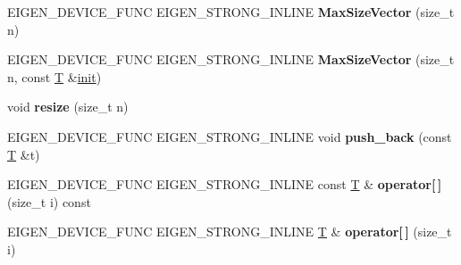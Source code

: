\begin{DoxyCompactItemize}
\item 
\mbox{\label{class_eigen_1_1_max_size_vector_a6a13cfcfe299b9ab443c0c483de82dbb}} 
E\+I\+G\+E\+N\+\_\+\+D\+E\+V\+I\+C\+E\+\_\+\+F\+U\+NC E\+I\+G\+E\+N\+\_\+\+S\+T\+R\+O\+N\+G\+\_\+\+I\+N\+L\+I\+NE {\bfseries Max\+Size\+Vector} (size\+\_\+t n)
\item 
\mbox{\label{class_eigen_1_1_max_size_vector_a917e97a3c9326232702b0f8fc7c4c2d3}} 
E\+I\+G\+E\+N\+\_\+\+D\+E\+V\+I\+C\+E\+\_\+\+F\+U\+NC E\+I\+G\+E\+N\+\_\+\+S\+T\+R\+O\+N\+G\+\_\+\+I\+N\+L\+I\+NE {\bfseries Max\+Size\+Vector} (size\+\_\+t n, const \hyperlink{group___sparse_core___module}{T} \&\hyperlink{structinit}{init})
\item 
\mbox{\label{class_eigen_1_1_max_size_vector_aa438323b34ae0f12ae27db22d70891d8}} 
void {\bfseries resize} (size\+\_\+t n)
\item 
\mbox{\label{class_eigen_1_1_max_size_vector_a8e7af55e22c320493f08e371813c8cea}} 
E\+I\+G\+E\+N\+\_\+\+D\+E\+V\+I\+C\+E\+\_\+\+F\+U\+NC E\+I\+G\+E\+N\+\_\+\+S\+T\+R\+O\+N\+G\+\_\+\+I\+N\+L\+I\+NE void {\bfseries push\+\_\+back} (const \hyperlink{group___sparse_core___module}{T} \&t)
\item 
\mbox{\label{class_eigen_1_1_max_size_vector_a9d3808ef49363f9eebd424b7f66dbbea}} 
E\+I\+G\+E\+N\+\_\+\+D\+E\+V\+I\+C\+E\+\_\+\+F\+U\+NC E\+I\+G\+E\+N\+\_\+\+S\+T\+R\+O\+N\+G\+\_\+\+I\+N\+L\+I\+NE const \hyperlink{group___sparse_core___module}{T} \& {\bfseries operator\mbox{[}$\,$\mbox{]}} (size\+\_\+t i) const
\item 
\mbox{\label{class_eigen_1_1_max_size_vector_a78a4edb41153305d15a3daf2ec64b16c}} 
E\+I\+G\+E\+N\+\_\+\+D\+E\+V\+I\+C\+E\+\_\+\+F\+U\+NC E\+I\+G\+E\+N\+\_\+\+S\+T\+R\+O\+N\+G\+\_\+\+I\+N\+L\+I\+NE \hyperlink{group___sparse_core___module}{T} \& {\bfseries operator\mbox{[}$\,$\mbox{]}} (size\+\_\+t i)
\item 
\mbox{\label{class_eigen_1_1_max_size_vector_a3220d79e0c200d4bd05cd494ae47ae7b}} 

\end{DoxyCompactItemize}

